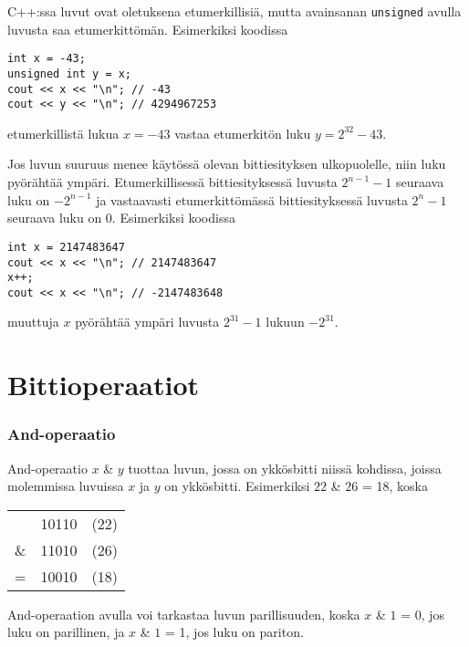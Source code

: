 C++:ssa luvut ovat oletuksena etumerkillisiä,
mutta avainsanan \texttt{unsigned} avulla
luvusta saa etumerkittömän.
Esimerkiksi koodissa

\begin{lstlisting}
int x = -43;
unsigned int y = x;
cout << x << "\n"; // -43
cout << y << "\n"; // 4294967253
\end{lstlisting}

etumerkillistä lukua $x=-43$ vastaa etumerkitön luku $y=2^{32}-43$.

Jos luvun suuruus menee käytössä
olevan bittiesityksen ulkopuolelle,
niin luku pyörähtää ympäri.
Etumerkillisessä bittiesityksessä
luvusta $2^{n-1}-1$ seuraava luku on $-2^{n-1}$
ja vastaavasti etumerkittömässä bittiesityksessä
luvusta $2^n-1$ seuraava luku on $0$.
Esimerkiksi koodissa

\begin{lstlisting}
int x = 2147483647
cout << x << "\n"; // 2147483647
x++;
cout << x << "\n"; // -2147483648
\end{lstlisting}

muuttuja $x$ pyörähtää ympäri luvusta $2^{31}-1$ lukuun $-2^{31}$.

\section{Bittioperaatiot}

\newcommand\XOR{\mathbin{\char`\^}}

\subsubsection{And-operaatio}


And-operaatio $x$ \& $y$ tuottaa luvun,
jossa on ykkösbitti niissä kohdissa,
joissa molemmissa luvuissa $x$ ja $y$ on ykkösbitti.
Esimerkiksi $22$ \& $26$ = 18, koska

\begin{center}
\begin{tabular}{rrr}
& 10110 & (22)\\
\& & 11010 & (26) \\
\hline
 = & 10010 & (18) \\
\end{tabular}
\end{center}

And-operaation avulla voi tarkastaa luvun parillisuuden,
koska $x$ \& $1$ = 0, jos luku on parillinen,
ja $x$ \& $1$ = 1, jos luku on pariton.

